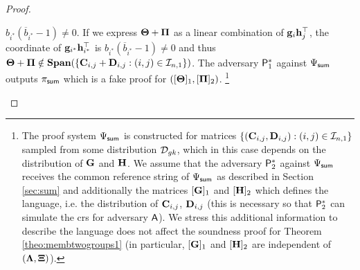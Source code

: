 \begin{proof}
\begin{itemize}
$b_{i^*}(\overline{b}_{i^*} -1) \neq 0$.
If we express $\mathbf{{\Theta}}+\mathbf{{\Pi}}$
as a linear combination of $\mathbf{g}_{i}\mathbf{h}_{j}^{\top}$, the coordinate of
$\mathbf{g}_{i^*}\mathbf{h}_{i^*}^\top$ is $b_{i^*}(\overline{b}_{i^*}-1)\neq 0$ and thus $\mathbf{{\Theta}}+\mathbf{{\Pi}}\notin\mathbf{Span}(\{\mathbf{{C}}_{i,j}+\mathbf{{D}}_{i,j}:(i,j)\in\mathcal{I}_{n,1}\})$.
The adversary $\mathsf{P}^*_1$ against ${\Psi_{\mathsf{sum}}}$  outputs  $\pi_{\mathsf{sum}}$
which is a fake proof for $([\mathbf{{\Theta}}]_1, [\mathbf{{\Pi}}]_2)$. \footnote{The proof system $\Psi_{\mathsf{sum}}$ is constructed for matrices $\{(\mathbf{{C}}_{i,j},\mathbf{{D}}_{i,j}):(i,j)\in\mathcal{I}_{n,1}\}$ sampled from some distribution $\mathcal{D}_{{gk}}$, which in this case depends on the distribution of $\mathbf{{G}}$ and $\mathbf{{H}}$. We assume that the adversary $\mathsf{P}^*_2$ against $\Psi_{\mathsf{sum}}$ receives the common reference string of $\Psi_{\mathsf{sum}}$ as described in Section \ref{sec:sum} and additionally the matrices $[\mathbf{{G}}]_1$ and $[\mathbf{{H}}]_2$ which defines the language, i.e. the distribution of $\mathbf{{C}}_{i,j}$, $\mathbf{{D}}_{i,j}$ (this is necessary so that $\mathsf{P}^*_2$ can simulate the crs for adversary $\mathsf{A}$). We stress this additional information to describe the language does not affect the soundness proof for Theorem \ref{theo:membtwogroups1} (in particular,  $[\mathbf{{G}}]_1$ and $[\mathbf{{H}}]_2$ are independent of $(\mathbf{{\Lambda}}, \mathbf{{\Xi}})$).}
\end{itemize}
\end{proof}
